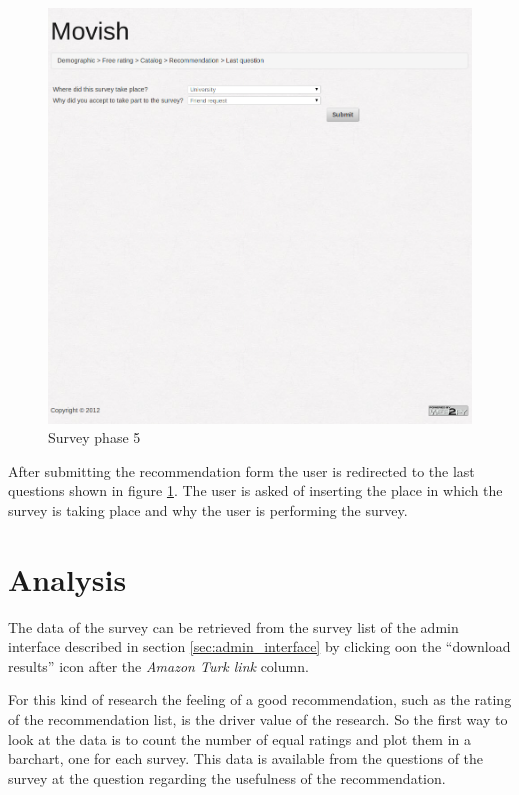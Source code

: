 \begin{figure}
  \centering
  \includegraphics[width=\textwidth]{figures/survey_localinfo.png}
  \caption{Survey phase 5}
  \label{fig:survey_phase_5}
\end{figure}

After submitting the recommendation form the user is redirected to the last questions shown in figure \ref{fig:survey_phase_5}. The user is asked of inserting the place in which the survey is taking place and why the user is performing the survey.

\section{Analysis}
\label{sec:research_analysis}

The data of the survey can be retrieved from the survey list of the admin interface described in section \ref{sec:admin_interface} by clicking oon the ``download results'' icon after the \textit{Amazon Turk link} column.

For this kind of research the feeling of a good recommendation, such as the rating of the recommendation list, is the driver value of the research. So the first way to look at the data is to count the number of equal ratings and plot them in a barchart, one for each survey. This data is available from the questions of the survey at the question regarding the usefulness of the recommendation.

